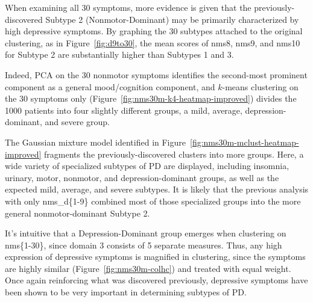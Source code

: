\documentclass[10pt]{article}
\begin{document}
\begin{multicols}{2}
When examining all 30 symptoms, more evidence is given that the previously-discovered Subtype
2 (Nonmotor-Dominant) may be primarily characterized by high depressive symptoms. By graphing the
30 subtypes attached to the original clustering, as in Figure~\ref{fig:d9to30}, the mean scores of
nms8, nms9, and nms10 for Subtype 2 are substantially higher than Subtypes 1 and 3.

Indeed, PCA on the 30 nonmotor symptoms identifies the second-most prominent component as a general
mood/cognition component, and $k$-means clustering on the 30 symptoms only
(Figure~\ref{fig:nms30m-k4-heatmap-improved}) divides the 1000 patients into four slightly
different groups, a mild, average, depression-dominant, and severe group.

The Gaussian mixture model identified in Figure~\ref{fig:nms30m-mclust-heatmap-improved} fragments
the previously-discovered clusters into more groups. Here, a wide variety of specialized subtypes
of PD are displayed, including insomnia, urinary, motor, nonmotor, and depression-dominant groups,
as well as the expected mild, average, and severe subtypes. It is likely that the previous analysis
with only nms\_d\{1-9\} combined most of those specialized groups into the more general
nonmotor-dominant Subtype 2.

It's intuitive that a Depression-Dominant group emerges when clustering on nms\{1-30\}, since
domain 3 consists of 5 separate measures. Thus, any high expression of depressive symptoms is
magnified in clustering, since the symptoms are highly similar (Figure~\ref{fig:nms30m-colhc}) and
treated with equal weight. Once again reinforcing what was discovered previously, depressive
symptoms have been shown to be very important in determining subtypes of PD.




\end{multicols}
\end{document}
